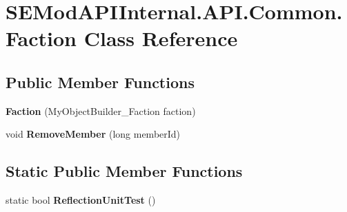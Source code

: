 \hypertarget{class_s_e_mod_a_p_i_internal_1_1_a_p_i_1_1_common_1_1_faction}{}\section{S\+E\+Mod\+A\+P\+I\+Internal.\+A\+P\+I.\+Common.\+Faction Class Reference}
\label{class_s_e_mod_a_p_i_internal_1_1_a_p_i_1_1_common_1_1_faction}
\subsection*{Public Member Functions}
\begin{DoxyCompactItemize}
\item 
\hypertarget{class_s_e_mod_a_p_i_internal_1_1_a_p_i_1_1_common_1_1_faction_ad32649dcbb58f905bdfe38a8f2a93a74}{}{\bfseries Faction} (My\+Object\+Builder\+\_\+\+Faction faction)\label{class_s_e_mod_a_p_i_internal_1_1_a_p_i_1_1_common_1_1_faction_ad32649dcbb58f905bdfe38a8f2a93a74}

\item 
\hypertarget{class_s_e_mod_a_p_i_internal_1_1_a_p_i_1_1_common_1_1_faction_aa5198952c6b601a82aef93721a76a475}{}void {\bfseries Remove\+Member} (long member\+Id)\label{class_s_e_mod_a_p_i_internal_1_1_a_p_i_1_1_common_1_1_faction_aa5198952c6b601a82aef93721a76a475}

\end{DoxyCompactItemize}
\subsection*{Static Public Member Functions}
\begin{DoxyCompactItemize}
\item 
\hypertarget{class_s_e_mod_a_p_i_internal_1_1_a_p_i_1_1_common_1_1_faction_a98935d510196a05601fac0108d04b81f}{}static bool {\bfseries Reflection\+Unit\+Test} ()\label{class_s_e_mod_a_p_i_internal_1_1_a_p_i_1_1_common_1_1_faction_a98935d510196a05601fac0108d04b81f}

\end{DoxyCompactItemize}
